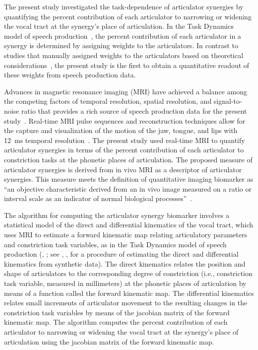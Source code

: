 \documentclass[reprint]{JASAnew}\usepackage[]{graphicx}\usepackage[]{color}
\begin{document}
The present study investigated the task-dependence of articulator synergies by quantifying the percent contribution of each articulator to narrowing or widening the vocal tract at the synergy's place of articulation. 
%
In the Task Dynamics model of speech production~\citep{saltzman1989dynamical}, the percent contribution of each articulator in a synergy is determined by assigning weights to the articulators. 
%
In contrast to studies that manually assigned weights to the articulators based on theoretical considerations~\citep[for example, see][for an assignment of weights based on articulator mass]{simko2010embodied}, the present study is the first to obtain a quantitative readout of these weights from speech production data. 

Advances in magnetic resonance imaging (MRI) have achieved a balance among the competing factors of temporal resolution, spatial resolution, and signal-to-noise ratio that provides a rich source of speech production data for the present study~\citep{scott2014speech}. Real-time MRI pulse sequences and reconstruction techniques allow for the capture and visualization of the motion of the jaw, tongue, and lips with \SI{12}{\milli\second} temporal resolution~\citep{toutios2016advances,lingala2016state}. 
%
The present study used real-time MRI to quantify articulator synergies in terms of the percent contribution of each articulator to constriction tasks at the phonetic places of articulation.
%
The proposed measure of articulator synergies is derived from in vivo MRI as a descriptor of articulator synergies. This measure meets the definition of quantitative imaging biomarker as ``an objective characteristic derived from an in vivo image measured on a ratio or interval scale as an indicator of normal biological processes''~\citep{kessler2015emerging,sullivan2015metrology}. 





The algorithm for computing the articulator synergy biomarker involves a statistical model of the direct and differential kinematics of the vocal tract, which uses MRI to estimate a forward kinematic map relating articulatory parameters and constriction task variables, as in the Task Dynamics model of speech production (\citeauthor{saltzman1989dynamical}, \citeyear{saltzman1989dynamical}; see \citeauthor{lammert2013statistical}, \citeyear{lammert2013statistical}, for a procedure of estimating the direct and differential kinematics from synthetic data). 
%
The direct kinematics relates the position and shape of articulators to the corresponding degree of constriction (i.e., constriction task variable, measured in millimeters) at the phonetic places of articulation by means of a function called the forward kinematic map. 
%
The differential kinematics relates small increments of articulator movement to the resulting changes in the constriction task variables by means of the jacobian matrix of the forward kinematic map. 
%
The algorithm computes the percent contribution of each articulator to narrowing or widening the vocal tract at the synergy's place of articulation using the jacobian matrix of the forward kinematic map. 
\end{document}

